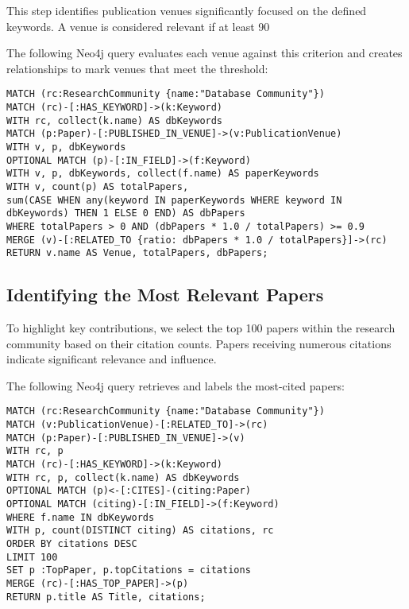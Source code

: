 \documentclass{article}
\begin{document}
This step identifies publication venues significantly focused on the defined keywords. A venue is considered relevant if at least 90%

The following Neo4j query evaluates each venue against this criterion and creates relationships to mark venues that meet the threshold:

\begin{verbatim}
MATCH (rc:ResearchCommunity {name:"Database Community"})
MATCH (rc)-[:HAS_KEYWORD]->(k:Keyword)
WITH rc, collect(k.name) AS dbKeywords
MATCH (p:Paper)-[:PUBLISHED_IN_VENUE]->(v:PublicationVenue)
WITH v, p, dbKeywords
OPTIONAL MATCH (p)-[:IN_FIELD]->(f:Keyword)
WITH v, p, dbKeywords, collect(f.name) AS paperKeywords
WITH v, count(p) AS totalPapers,
sum(CASE WHEN any(keyword IN paperKeywords WHERE keyword IN dbKeywords) THEN 1 ELSE 0 END) AS dbPapers
WHERE totalPapers > 0 AND (dbPapers * 1.0 / totalPapers) >= 0.9
MERGE (v)-[:RELATED_TO {ratio: dbPapers * 1.0 / totalPapers}]->(rc)
RETURN v.name AS Venue, totalPapers, dbPapers;
\end{verbatim}

\subsection{Identifying the Most Relevant Papers}

To highlight key contributions, we select the top 100 papers within the research community based on their citation counts. Papers receiving numerous citations indicate significant relevance and influence.

The following Neo4j query retrieves and labels the most-cited papers:

\begin{verbatim}
MATCH (rc:ResearchCommunity {name:"Database Community"})
MATCH (v:PublicationVenue)-[:RELATED_TO]->(rc)
MATCH (p:Paper)-[:PUBLISHED_IN_VENUE]->(v)
WITH rc, p
MATCH (rc)-[:HAS_KEYWORD]->(k:Keyword)
WITH rc, p, collect(k.name) AS dbKeywords
OPTIONAL MATCH (p)<-[:CITES]-(citing:Paper)
OPTIONAL MATCH (citing)-[:IN_FIELD]->(f:Keyword)
WHERE f.name IN dbKeywords
WITH p, count(DISTINCT citing) AS citations, rc
ORDER BY citations DESC
LIMIT 100
SET p :TopPaper, p.topCitations = citations
MERGE (rc)-[:HAS_TOP_PAPER]->(p)
RETURN p.title AS Title, citations;
\end{verbatim}
\end{document}

